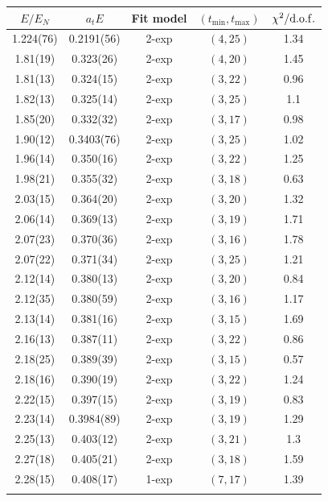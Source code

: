 \begin{table}[H]
    \centering
    \begin{tabu}{c|c|c|c|c}
        $E / E_N$ & $a_t E$ & Fit model & $(t_{\mathrm{min}}, {t_\mathrm{max}})$ & $\chi^2 / \rm{d.o.f.}$\\
        \hline
        \rowfont{\color{red}}
        1.224(76)&0.2191(56)&2{-}exp&$(4, 25)$&1.34 \\
        1.81(19)&0.323(26)&2{-}exp&$(4, 20)$&1.45 \\
        1.81(13)&0.324(15)&2{-}exp&$(3, 22)$&0.96 \\
        1.82(13)&0.325(14)&2{-}exp&$(3, 25)$&1.1 \\
        1.85(20)&0.332(32)&2{-}exp&$(3, 17)$&0.98 \\
        1.90(12)&0.3403(76)&2{-}exp&$(3, 25)$&1.02 \\
        1.96(14)&0.350(16)&2{-}exp&$(3, 22)$&1.25 \\
        1.98(21)&0.355(32)&2{-}exp&$(3, 18)$&0.63 \\
        2.03(15)&0.364(20)&2{-}exp&$(3, 20)$&1.32 \\
        2.06(14)&0.369(13)&2{-}exp&$(3, 19)$&1.71 \\
        2.07(23)&0.370(36)&2{-}exp&$(3, 16)$&1.78 \\
        2.07(22)&0.371(34)&2{-}exp&$(3, 25)$&1.21 \\
        2.12(14)&0.380(13)&2{-}exp&$(3, 20)$&0.84 \\
        \rowfont{\color{red}}
        2.12(35)&0.380(59)&2{-}exp&$(3, 16)$&1.17 \\
        2.13(14)&0.381(16)&2{-}exp&$(3, 15)$&1.69 \\
        2.16(13)&0.387(11)&2{-}exp&$(3, 22)$&0.86 \\
        \rowfont{\color{red}}
        2.18(25)&0.389(39)&2{-}exp&$(3, 15)$&0.57 \\
        \rowfont{\color{red}}
        2.18(16)&0.390(19)&2{-}exp&$(3, 22)$&1.24 \\
        \rowfont{\color{red}}
        2.22(15)&0.397(15)&2{-}exp&$(3, 19)$&0.83 \\
        2.23(14)&0.3984(89)&2{-}exp&$(3, 19)$&1.29 \\
        2.25(13)&0.403(12)&2{-}exp&$(3, 21)$&1.3 \\
        2.27(18)&0.405(21)&2{-}exp&$(3, 18)$&1.59 \\
        2.28(15)&0.408(17)&1{-}exp&$(7, 17)$&1.39 \\
        \rowfont{\color{red}}

\end{tabu}
\end{table}
